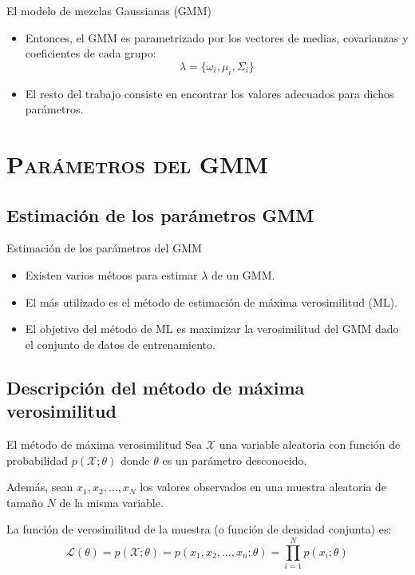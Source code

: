 \documentclass[xcolor=x11names,compress]{beamer}
\renewcommand{\(}{\begin{columns}}
\renewcommand{\)}{\end{columns}}
\newcommand{\<}[1]{\begin{column}{#1}}
\renewcommand{\>}{\end{column}}
\begin{document}
\begin{frame}{El modelo de mezclas Gaussianas (GMM)}
\begin{itemize}
	\item Entonces, el GMM es parametrizado por los vectores de medias, covarianzas y coeficientes de cada grupo:
		$$
		\lambda = \{ \omega _i, \mu _i, \Sigma _i \}
		$$
		\item El resto del trabajo consiste en encontrar los valores adecuados para dichos parámetros.
\end{itemize}  
\end{frame}

\section{\scshape Parámetros del GMM}
\subsection{Estimación de los parámetros GMM}
\begin{frame}{Estimación de los parámetros del GMM}
   	\begin{itemize}
   		\item Existen varios métoos para estimar $\lambda$ de un GMM.
   		\item El más utilizado es el método de estimación de máxima verosimilitud (ML).
   		\item El objetivo del método de ML es maximizar la verosimilitud del GMM dado el conjunto de datos de entrenamiento.
   	\end{itemize}
\end{frame}

\subsection{Descripción del método de máxima verosimilitud}
\begin{frame}{El método de máxima verosimilitud}   	
Sea $\mathcal{X}$ una variable aleatoria con función de probabilidad $p(\mathcal{X};\theta)$ donde $\theta$ es un parámetro desconocido.

Además, sean $x_1,x_2,\ldots ,x_N$ los valores observados en una muestra aleatoria de tamaño $N$ de la misma variable.

La función de verosimilitud de la muestra (o función de densidad conjunta) es:
\begin{equation}
\mathcal{L}(\theta) = p(\mathcal{X};\theta) = p(x_1,x_2,\ldots,x_n ; \theta) = \prod_{i=1}^N p(x_i ; \theta)
\end{equation}
\end{frame}
\end{document}
